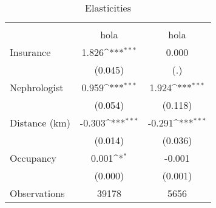 \begin{table}[htbp]\centering
\def\sym#1{\ifmmode^{#1}\else\(^{#1}\)\fi}
\caption{Elasticities}
\begin{tabular}{l*{2}{c}}
\toprule
                    &\multicolumn{1}{c}{} &\multicolumn{1}{c}{} \\
                    &        hola         &        hola         \\
\midrule
Insurance           &       1.826\sym{***}&       0.000         \\
                    &     (0.045)         &         (.)         \\
Nephrologist        &       0.959\sym{***}&       1.924\sym{***}\\
                    &     (0.054)         &     (0.118)         \\
Distance (km)       &      -0.303\sym{***}&      -0.291\sym{***}\\
                    &     (0.014)         &     (0.036)         \\
Occupancy           &       0.001\sym{*}  &      -0.001         \\
                    &     (0.000)         &     (0.001)         \\
\midrule
Observations        &       39178         &        5656         \\
\bottomrule
\end{tabular}
\end{table}
